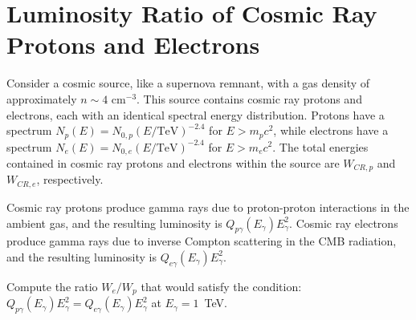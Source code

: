 \section{Luminosity Ratio of Cosmic Ray Protons and Electrons}

Consider a cosmic source, like a supernova remnant, with a gas density of approximately \(n \sim 4\) cm\(^{-3}\). This source contains cosmic ray protons and electrons, each with an identical spectral energy distribution. Protons have a spectrum \(N_p(E) = N_{0, p} (E/\text{TeV})^{-2.4}\) for \(E > m_p c^2\), while electrons have a spectrum \(N_e(E) = N_{0, e} (E/\text{TeV})^{-2.4}\) for \(E > m_e c^2\). 
%
The total energies contained in cosmic ray protons and electrons within the source are \(W_{CR, p}\) and \(W_{CR, e}\), respectively.

Cosmic ray protons produce gamma rays due to proton-proton interactions in the ambient gas, and the resulting luminosity is \(Q_{p\gamma}(E_\gamma)E_\gamma^2\). Cosmic ray electrons produce gamma rays due to inverse Compton scattering in the CMB radiation, and the resulting luminosity is \(Q_{e\gamma}(E_\gamma)E_\gamma^2\).

Compute the ratio \( W_e / W_p \) that would satisfy the condition: \(Q_{p\gamma}(E_\gamma)E_\gamma^2 = Q_{e\gamma}(E_\gamma)E_\gamma^2\) at \( E_\gamma = 1 \)~TeV.